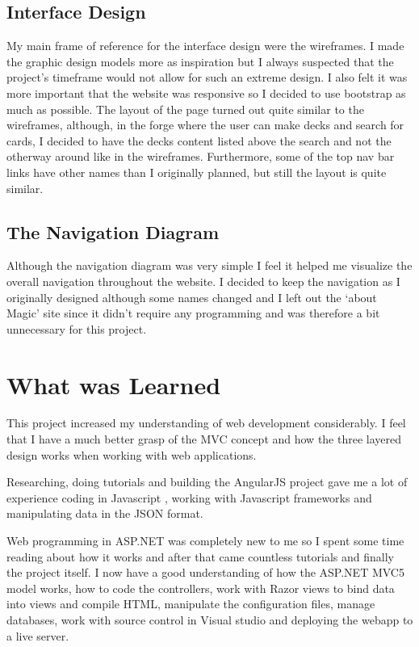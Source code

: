 \documentclass[paper=a4, fontsize=11pt]{scrartcl} %
\numberwithin{equation}{section} %
\numberwithin{figure}{section} %
\numberwithin{table}{section} %
\begin{document}
\subsection{Interface Design}
My main frame of reference for the interface design were the wireframes. I made the graphic design models more as inspiration but I always suspected that the project’s timeframe would not allow for such an extreme design. I also felt it was more important that the website was responsive so I decided to use bootstrap as much as possible. The layout of the page turned out quite similar to the wireframes, although, in the forge where the user can make decks and search for cards, I decided to have the decks content listed above the search and not the otherway around like in the wireframes. Furthermore, some of the top nav bar links have other names than I originally planned, but still the layout is quite similar.
\subsection{The Navigation Diagram}
Although the navigation diagram was very simple I feel it helped me visualize the overall navigation throughout the website. I decided to keep the navigation as I originally designed although some names changed and I left out the ‘about Magic’ site since it didn’t require any programming and was therefore a bit unnecessary for this project.

\section{What was Learned}
This project increased my understanding of web development considerably. I feel that I have a much better grasp of the MVC concept and how the three layered design works when working with web applications.
  
Researching, doing tutorials and building the AngularJS project gave me a lot of experience coding in Javascript , working with Javascript frameworks and manipulating data in the JSON format.

Web programming in ASP.NET was completely new to me so I spent some time reading about how it works and after that came countless tutorials and finally the project itself. I now have a good understanding of how the ASP.NET MVC5 model works, how to code the controllers, work with Razor views to bind data into views and compile HTML, manipulate the configuration files, manage databases, work with source control in Visual studio and deploying the webapp to a live server.
\end{document}
